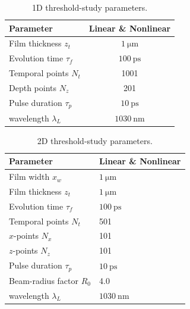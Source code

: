\begin{table}[htbp]
    \centering
    \caption{1D threshold-study parameters.}
    \label{tab:ch3-1d-params}
    \begin{tabular}{@{}lc@{}}
        \toprule
        \rowcolor{gray!20}
        \textbf{Parameter}        & \textbf{Linear \& Nonlinear} \\
        \midrule
        Film thickness \(z_t\)    & \(\SI{1}{\micro\metre}\)     \\
        Evolution time \(\tau_f\) & \(\SI{100}{\pico\second}\)   \\
        Temporal points \(N_t\)   & 1001                         \\
        Depth points \(N_z\)      & 201                          \\
        Pulse duration \(\tau_p\) & \(\SI{10}{\pico\second}\)    \\
        wavelength \(\lambda_L\)  & \(\SI{1030}{\nano\metre}\)   \\
        \bottomrule
    \end{tabular}
\end{table}

\begin{table}[htbp]
    \centering
    \caption{2D threshold-study parameters.}
    \label{tab:ch3-2d-params}
    \begin{tabular}{@{}ll@{}}
        \toprule
        \rowcolor{gray!20}
        \textbf{Parameter}         & \textbf{Linear \& Nonlinear} \\
        \midrule
        Film width \(x_w\)         & \(\SI{1}{\micro\metre}\)     \\
        Film thickness \(z_t\)     & \(\SI{1}{\micro\metre}\)     \\
        Evolution time \(\tau_f\)  & \(\SI{100}{\pico\second}\)   \\
        Temporal points \(N_t\)    & 501                          \\
        \(x\)-points \(N_x\)       & 101                          \\
        \(z\)-points \(N_z\)       & 101                          \\
        Pulse duration \(\tau_p\)  & \(\SI{10}{\pico\second}\)    \\
        Beam-radius factor \(R_0\) & 4.0                          \\
        wavelength \(\lambda_L\)   & \(\SI{1030}{\nano\metre}\)   \\
        \bottomrule
    \end{tabular}
\end{table}

